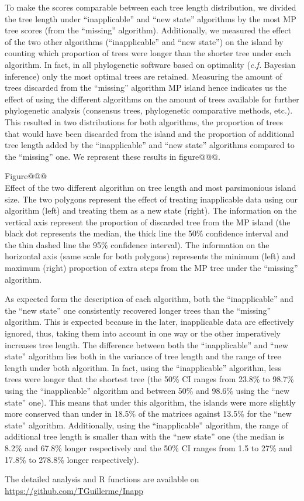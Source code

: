 \documentclass[a4paper,11pt]{article}
\begin{document}
To make the scores comparable between each tree length distribution, we divided the tree length under ``inapplicable'' and ``new state'' algorithms by the most MP tree scores (from the ``missing'' algorithm).
Additionally, we measured the effect of the two other algorithms (``inapplicable'' and ``new state'') on the island by counting which proportion of trees were longer than the shorter tree under each algorithm.
In fact, in all phylogenetic software based on optimality (\textit{c.f.} Bayesian inference) only the most optimal trees are retained.
Measuring the amount of trees discarded from the ``missing'' algorithm MP island hence indicates us the effect of using the different algorithms on the amount of trees available for further phylogenetic analysis (consensus trees, phylogenetic comparative methods, etc.).
This resulted in two distributions for both algorithms, the proportion of trees that would have been discarded from the island and the proportion of additional tree length added by the ``inapplicable'' and ``new state'' algorithms compared to the ``missing'' one. 
We represent these results in figure@@@.

Figure@@@\\
Effect of the two different algorithm on tree length and most parsimonious island size. The two polygons represent the effect of treating inapplicable data using our algorithm (left) and treating them as a new state (right). The information on the vertical axis represent the proportion of discarded tree from the MP island (the black dot represents the median, the thick line the 50\% confidence interval and the thin dashed line the 95\% confidence interval). The information on the horizontal axis (same scale for both polygons) represents the minimum (left) and maximum (right) proportion of extra steps from the MP tree under the ``missing'' algorithm.

As expected form the description of each algorithm, both the ``inapplicable'' and the ``new state'' one consistently recovered longer trees than the ``missing'' algorithm.
This is expected because in the later, inapplicable data are effectively ignored, thus, taking them into account in one way or the other imperatively increases tree length.
The difference between both the ``inapplicable'' and ``new state'' algorithm lies both in the variance of tree length and the range of tree length under both algorithm.
In fact, using the ``inapplicable'' algorithm, less trees were longer that the shortest tree (the 50\% CI ranges from 23.8\% to 98.7\% using the ``inapplicable'' algorithm and between 50\% and 98.6\% using the ``new state'' one).
This means that under this algorithm, the islands were more slightly more conserved than under in 18.5\% of the matrices against 13.5\% for the ``new state'' algorithm.
Additionally, using the ``inapplicable'' algorithm, the range of additional tree length is smaller than with the ``new state'' one (the median is 8.2\% and 67.8\% longer respectively and the 50\% CI ranges from 1.5 to 27\% and 17.8\% to 278.8\% longer respectively).

The detailed analysis and R functions are available on \url{https://github.com/TGuillerme/Inapp}
\end{document}
